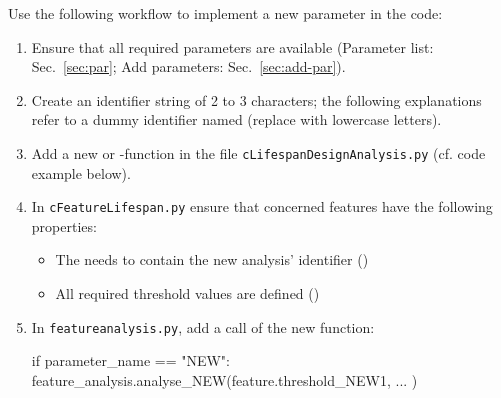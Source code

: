 Use the following workflow to implement a new parameter in the code:
\begin{enumerate}
	\item Ensure that all required parameters are available (Parameter list: Sec.~\ref{sec:par}; Add parameters: Sec.~\ref{sec:add-par}).
	\item Create an identifier string of 2 to 3 characters; the following explanations refer to a dummy identifier named  (replace with lowercase letters).
	\item Add a new  or -function in the file \texttt{cLifespanDesignAnalysis.py} (cf. code example below).
	\item In \texttt{cFeatureLifespan.py} ensure that concerned features have the following properties:
	\begin{itemize}
		\item The  needs to contain the new analysis' identifier ()
		\item All required threshold values are defined ()
	\end{itemize}
	\item In \texttt{feature{\myUnderscore}analysis.py}, add a call of the new function:\\
	\begin{python}
	  if parameter_name == "NEW":
	    feature_analysis.analyse_NEW(feature.threshold_NEW1, ... )
	\end{python}
\end{enumerate}

